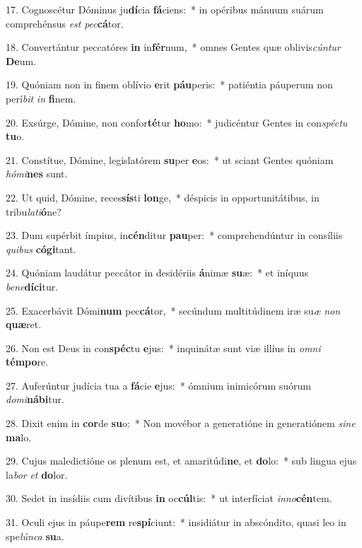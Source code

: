 17. Cognoscétur Dóminus ju\textbf{dí}cia \textbf{fá}ciens:~*  in opéribus mánuum suárum comprehénsus \textit{est} \textit{pec}\textbf{cá}tor.\

18. Convertántur peccatóres \textbf{in} in\textbf{fér}num,~*  omnes Gentes quæ oblivis\textit{cún}\textit{tur} \textbf{De}um.\

19. Quóniam non in finem oblívio \textbf{e}rit \textbf{páu}peris:~*  patiéntia páuperum non perí\textit{bit} \textit{in} \textbf{fi}nem.\

20. Exsúrge, Dómine, non confor\textbf{té}tur \textbf{ho}mo:~*  judicéntur Gentes in con\textit{spéc}\textit{tu} \textbf{tu}o.\

21. Constítue, Dómine, legislatórem \textbf{su}per \textbf{e}os:~*  ut sciant Gentes quóniam \textit{hó}\textit{mi}\textbf{nes} sunt.\

22. Ut quid, Dómine, reces\textbf{sís}ti \textbf{lon}ge,~*  déspicis in opportunitátibus, in tribu\textit{la}\textit{ti}\textbf{ó}ne?\

23. Dum supérbit ímpius, in\textbf{cén}ditur \textbf{pau}per:~*  comprehendúntur in consíliis \textit{qui}\textit{bus} \textbf{có}\textbf{gi}tant.\

24. Quóniam laudátur peccátor in desidériis \textbf{á}nimæ \textbf{su}æ:~*  et iníquus \textit{be}\textit{ne}\textbf{dí}\textbf{ci}tur.\

25. Exacerbávit Dómi\textbf{num} pec\textbf{cá}tor,~*  secúndum multitúdinem iræ su\textit{æ} \textit{non} \textbf{quæ}ret.\

26. Non est Deus in con\textbf{spéc}tu \textbf{e}jus:~*  inquinátæ sunt viæ illíus in \textit{om}\textit{ni} \textbf{tém}\textbf{po}re.\

27. Auferúntur judícia tua a \textbf{fá}cie \textbf{e}jus:~*  ómnium inimicórum suórum \textit{do}\textit{mi}\textbf{ná}\textbf{bi}tur.\

28. Dixit enim in \textbf{cor}de \textbf{su}o:~*  Non movébor a generatióne in generatiónem \textit{si}\textit{ne} \textbf{ma}lo.\

29. Cujus maledictióne os plenum est, et amaritúdi\textbf{ne}, et \textbf{do}lo:~*  sub lingua ejus la\textit{bor} \textit{et} \textbf{do}lor.\

30. Sedet in insídiis cum divítibus \textbf{in} oc\textbf{cúl}tis:~*  ut interfíciat \textit{in}\textit{no}\textbf{cén}tem.\

31. Oculi ejus in páupe\textbf{rem} re\textbf{spí}ciunt:~*  insidiátur in abscóndito, quasi leo in spe\textit{lún}\textit{ca} \textbf{su}a.\

